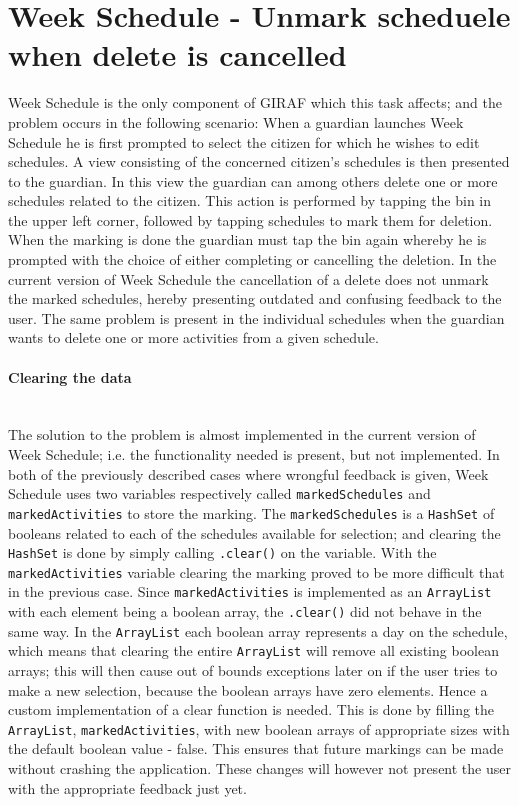 \section{Week Schedule - Unmark scheduele when delete is cancelled}
Week Schedule is the only component of GIRAF which this task affects; and the problem occurs in the following scenario:
When a guardian launches Week Schedule he is first prompted to select the citizen for which he wishes to edit schedules.
A view consisting of the concerned citizen's schedules is then presented to the guardian.
In this view the guardian can among others delete one or more schedules related to the citizen.
This action is performed by tapping the bin in the upper left corner, followed by tapping schedules to mark them for deletion.
When the marking is done the guardian must tap the bin again whereby he is prompted with the choice of either completing or cancelling the deletion.
In the current version of Week Schedule the cancellation of a delete does not unmark the marked schedules, hereby presenting outdated and confusing feedback to the user.
The same problem is present in the individual schedules when the guardian wants to delete one or more activities from a given schedule.

\paragraph{Clearing the data}\hfill\\
The solution to the problem is almost implemented in the current version of Week Schedule; i.e. the functionality needed is present, but not implemented.
In both of the previously described cases where wrongful feedback is given, Week Schedule uses two variables respectively called \texttt{markedSchedules} and \texttt{markedActivities} to store the marking.
The \texttt{markedSchedules} is a \texttt{HashSet} of booleans related to each of the schedules available for selection; and clearing the \texttt{HashSet} is done by simply calling \texttt{.clear()} on the variable.
With the \texttt{markedActivities} variable clearing the marking proved to be more difficult that in the previous case.
Since \texttt{markedActivities} is implemented as an \texttt{ArrayList} with each element being a boolean array, the \texttt{.clear()} did not behave in the same way.
In the \texttt{ArrayList} each boolean array represents a day on the schedule, which means that clearing the entire \texttt{ArrayList} will remove all existing boolean arrays; this will then cause out of bounds exceptions later on if the user tries to make a new selection, because the boolean arrays have zero elements. 
Hence a custom implementation of a clear function is needed.
This is done by filling the \texttt{ArrayList}, \texttt{markedActivities}, with new boolean arrays of appropriate sizes with the default boolean value - false.
This ensures that future markings can be made without crashing the application.
These changes will however not present the user with the appropriate feedback just yet.

